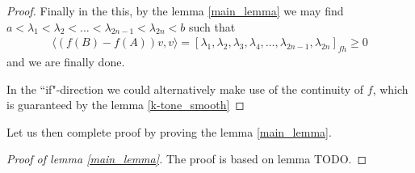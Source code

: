 \begin{proof}
	Finally in the this, by the lemma \ref{main_lemma} we may find $a < \lambda_{1} < \lambda_{2} < \ldots < \lambda_{2 n - 1} < \lambda_{2 n} < b$ such that
	\begin{align*}
		\langle (f(B) - f(A)) v, v \rangle = [\lambda_{1}, \lambda_{2}, \lambda_{3}, \lambda_{4}, \ldots, \lambda_{2n - 1}, \lambda_{2 n}]_{f h} \geq 0
	\end{align*}
	and we are finally done.

	In the ``if"-direction we could alternatively make use of the continuity of $f$, which is guaranteed by the lemma \ref{k-tone_smooth}

\end{proof}

Let us then complete proof by proving the lemma \ref{main_lemma}.

\begin{proof}[Proof of lemma \ref{main_lemma}]
	The proof is based on lemma TODO.
\end{proof}


